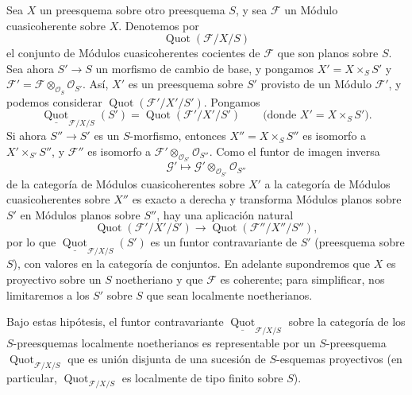 Sea $X$ un preesquema sobre otro preesquema $S$, y sea $\mathcal F$ un Módulo
cuasicoherente sobre $X$. Denotemos por
\[
\operatorname{Quot}(\mathcal F/X/S)
\]
el conjunto de Módulos cuasicoherentes cocientes de $\mathcal F$ que son
planos sobre $S$. Sea ahora $S'\longrightarrow S$ un morfismo de cambio de
base, y pongamos $X'=X\times_S S'$ y
$\mathcal F'=\mathcal F\otimes_{\mathcal O_S}\mathcal O_{S'}$. Así, $X'$ es
un preesquema sobre $S'$ provisto de un Módulo
$\mathcal F'$, y podemos considerar
$\operatorname{Quot}(\mathcal F'/X'/S')$. Pongamos
\[
\underline{\operatorname{Quot}}_{\mathcal F/X/S}(S')
=\operatorname{Quot}(\mathcal F'/X'/S')
\qquad\text{(donde $X'=X\times_SS'$)}.
\]
Si ahora $S''\longrightarrow S'$ es un $S$-morfismo, entonces
$X''=X\times_SS''$ es isomorfo a $X'\times_{S'}S''$, y $\mathcal F''$ es
isomorfo a $\mathcal F'\otimes_{\mathcal O_{S'}}\mathcal O_{S''}$. Como el
funtor de imagen inversa
\[
\mathcal G'\longmapsto
\mathcal G'\otimes_{\mathcal O_{S'}}\mathcal O_{S''}
\]
de la categoría de Módulos cuasicoherentes sobre $X'$ a la categoría de
Módulos cuasicoherentes sobre $X''$ es exacto a derecha y transforma Módulos
planos sobre $S'$ en Módulos planos sobre $S''$, hay una aplicación natural
\[
\operatorname{Quot}(\mathcal F'/X'/S')\longrightarrow
\operatorname{Quot}(\mathcal F''/X''/S''),
\]
por lo que $\underline{\operatorname{Quot}}_{\mathcal F/X/S}(S')$ es un
funtor contravariante de $S'$ (preesquema sobre $S$), con valores en la
categoría de conjuntos. En adelante supondremos que $X$ es proyectivo sobre un
$S$ noetheriano y que $\mathcal F$ es coherente; para simplificar, nos
limitaremos a los $S'$ sobre $S$ que sean localmente noetherianos.

 Bajo estas hipótesis, el funtor contravariante
$\underline{\operatorname{Quot}}_{\mathcal F/X/S}$ sobre la categoría de los
$S$-preesquemas localmente noetherianos es representable por un $S$-preesquema
$\operatorname{Quot}_{\mathcal F/X/S}$ que es unión disjunta de una sucesión
de $S$-esquemas proyectivos (en particular,
$\operatorname{Quot}_{\mathcal F/X/S}$ es localmente de tipo finito sobre
$S$).

